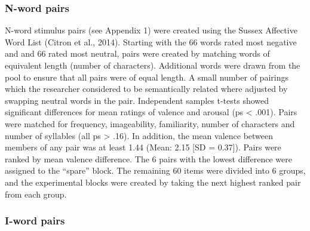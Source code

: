 \documentclass[man,floatsintext,a4paper,biblatex]{apa6}
\begin{document}
\subsubsection{N-word pairs}

N-word stimulus pairs (see Appendix 1) were created using the Sussex
Affective Word List (Citron et al., 2014). Starting with the 66
words rated most negative and and 66 rated most neutral, pairs were
created by matching words of equivalent length (number of characters).
Additional words were drawn from the pool to ensure that all pairs were of
equal length.  A small number of pairings which the researcher considered
to be semantically related where adjusted by swapping neutral words in
the pair.  Independent samples t-tests showed significant differences for
mean ratings of valence and arousal (ps < .001).  Pairs were matched
for frequency, imageability, familiarity, number of characters and
number of syllables (all  ps > .16).  In addition, the mean valence
between members of any pair was at least 1.44  (Mean: 2.15 [SD = 0.37]).
Pairs were ranked by mean valence difference.  The 6 pairs with the
lowest difference were assigned to the “spare” block.  The remaining
60 items were divided into 6 groups, and the experimental blocks were
created by taking the next highest ranked pair from each group.

\subsubsection{I-word pairs}
\end{document}
